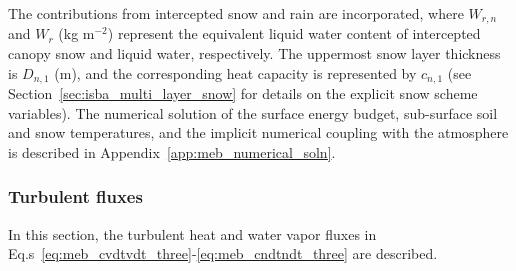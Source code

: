 %
The contributions from intercepted snow and rain are incorporated,
where $W_{r,n}$ and $W_r$ (kg m$^{-2}$) represent the 
equivalent liquid water content of
intercepted canopy snow and liquid water, respectively. 
%
The uppermost snow layer thickness is $D_{n,1}$ (m), and the
corresponding heat capacity is represented by $c_{n,1}$ 
(see Section~\ref{sec:isba_multi_layer_snow} for details on the
explicit snow scheme variables).
%
The numerical solution of the surface energy budget,
sub-surface soil and snow temperatures, and the implicit numerical
coupling with the atmosphere is described in 
Appendix~\ref{app:meb_numerical_soln}.

\subsubsection{Turbulent fluxes}
\label{sec:meb_energy_budget_turb}

In this section, the turbulent heat and water vapor fluxes 
in Eq.s~\ref{eq:meb_cvdtvdt_three}-\ref{eq:meb_cndtndt_three} are described.




